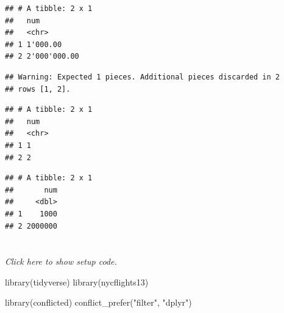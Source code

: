 \documentclass[]{book}
\newenvironment{Shaded}{}{}
\newcommand{\DataTypeTok}[1]{#1}
\newcommand{\KeywordTok}[1]{\textcolor[rgb]{0.00,0.00,1.00}{#1}}
\newcommand{\NormalTok}[1]{#1}
\newcommand{\OperatorTok}[1]{#1}
\newcommand{\StringTok}[1]{\textcolor[rgb]{0.00,0.50,0.50}{#1}}
\begin{document}
\begin{verbatim}
## # A tibble: 2 x 1
##   num         
##   <chr>       
## 1 1'000.00    
## 2 2'000'000.00
\end{verbatim}

\begin{Shaded}
\end{Shaded}

\begin{verbatim}
## Warning: Expected 1 pieces. Additional pieces discarded in 2
## rows [1, 2].
\end{verbatim}

\begin{verbatim}
## # A tibble: 2 x 1
##   num  
##   <chr>
## 1 1    
## 2 2
\end{verbatim}

\begin{Shaded}
\end{Shaded}

\begin{verbatim}
## # A tibble: 2 x 1
##       num
##     <dbl>
## 1    1000
## 2 2000000
\end{verbatim}

\hypertarget{section}{%
\section{}\label{section}}

\emph{Click here to show setup code.}

\begin{Shaded}
\begin{Highlighting}[]
\KeywordTok{library}\NormalTok{(tidyverse)}
\KeywordTok{library}\NormalTok{(nycflights13)}

\KeywordTok{library}\NormalTok{(conflicted)}
\KeywordTok{conflict_prefer}\NormalTok{(}\StringTok{"filter"}\NormalTok{, }\StringTok{"dplyr"}\NormalTok{)}
\end{Highlighting}
\end{Shaded}
\end{document}
